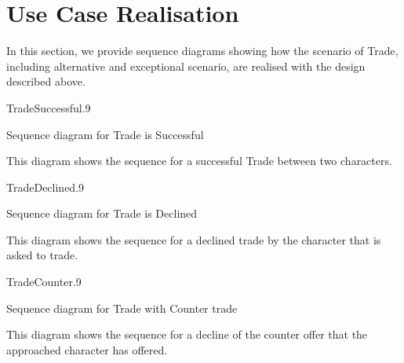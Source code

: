 \section{Use Case Realisation}
\label{sec:usecaserealisation}
In this section, we provide sequence diagrams showing how the scenario of Trade, including alternative and exceptional scenario, are realised with the design described above.

\begin{myfigure}{TradeSuccessful}{.9}%
	\caption{Sequence diagram for Trade is Successful}
	\label{fig:state-machine-server}
\end{myfigure}

This diagram shows the sequence for a successful Trade between two characters.

\begin{myfigure}{TradeDeclined}{.9}%
	\caption{Sequence diagram for Trade is Declined}
	\label{fig:state-machine-server}
\end{myfigure}

This diagram shows the sequence for a declined trade by the character that is asked to trade. 

\begin{myfigure}{TradeCounter}{.9}%
	\caption{Sequence diagram for Trade with Counter trade}
	\label{fig:state-machine-server}
\end{myfigure}

This diagram shows the sequence for a decline of the counter offer that the approached character has offered.
